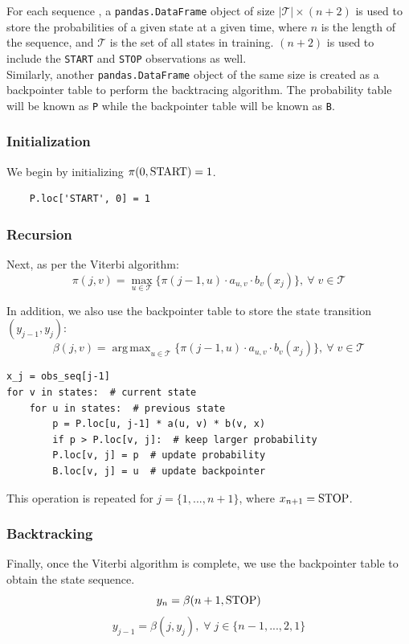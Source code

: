 \documentclass{article}
\DeclareMathOperator*{\argmax}{arg\,max}
\numberwithin{equation}{section}
\begin{document}
For each sequence , a \lstinline{pandas.DataFrame} object of size $\lvert\mathcal{T}\rvert \times (n+2)$ is used to store the probabilities of a given state at a given time, where $n$ is the length of the sequence, and $\mathcal{T}$ is the set of all states in training. $(n+2)$ is used to include the \lstinline{START} and \lstinline{STOP} observations as well.\\

Similarly, another \lstinline{pandas.DataFrame} object of the same size is created as a backpointer table to perform the backtracing algorithm. The probability table will be known as \lstinline{P} while the backpointer table will be known as \lstinline{B}.

\subsubsection{Initialization}
We begin by initializing $\pi(0, \text{\lstinline{START}}) = 1$.

\begin{verbatim}
    P.loc['START', 0] = 1
\end{verbatim}

\subsubsection{Recursion}
Next, as per the Viterbi algorithm:
	$$ \pi(j, v) = \max_{u\in\mathcal{T}} \{ \pi(j-1, u) \cdot a_{u, v} \cdot b_v(x_j) \}, \: \forall\; v \in \mathcal{T} $$
	
In addition, we also use the backpointer table to store the state transition $(y_{j-1}, y_j)$:
	$$\beta(j, v) = \argmax_{u\in\mathcal{T}} \{ \pi(j-1, u) \cdot a_{u, v} \cdot b_v(x_j) \}, \: \forall\; v \in \mathcal{T} $$
	
\begin{verbatim}
x_j = obs_seq[j-1]
for v in states:  # current state
    for u in states:  # previous state
        p = P.loc[u, j-1] * a(u, v) * b(v, x)
        if p > P.loc[v, j]:  # keep larger probability
        P.loc[v, j] = p  # update probability
        B.loc[v, j] = u  # update backpointer
\end{verbatim}

This operation is repeated for $j = \{1, ..., n+1\}$, where $x_{n+1} = \text{\lstinline{STOP}}$.

\subsubsection{Backtracking}
Finally, once the Viterbi algorithm is complete, we use the backpointer table to obtain the state sequence.
	$$ y_{n} = \beta(n+1, \text{\lstinline{STOP}}) $$
	$$ y_{j-1} = \beta(j, y_j),\; \forall\; j \in \{n-1, ..., 2, 1\} $$
\end{document}
